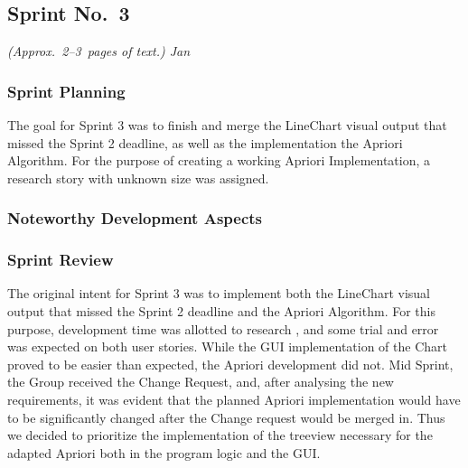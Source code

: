 
\subsection{Sprint No.~3}

\emph{(Approx.~2--3~pages of text.) Jan}

\subsubsection*{Sprint Planning}
The goal for Sprint 3 was to finish and merge the LineChart visual output that missed the Sprint 2 deadline, as well as the implementation the Apriori Algorithm. 
For the purpose of creating a working Apriori Implementation, a research story with unknown size was assigned. 

\subsubsection*{Noteworthy Development Aspects}

\subsubsection*{Sprint Review}
The original intent for Sprint 3 was to implement both the LineChart visual output that missed the Sprint 2 deadline and the Apriori Algorithm. For this purpose, development time was allotted to research , and some trial and error was expected on both user stories. 
While the GUI implementation of the Chart proved to be easier than expected, the Apriori development did not. Mid Sprint, the Group received the Change Request, and, after analysing the new requirements, it was evident that the planned Apriori implementation would have to be significantly changed after the Change request would be merged in. 
Thus we decided to prioritize the implementation of the treeview necessary for the adapted Apriori both in the program logic and the GUI. 
